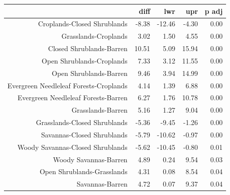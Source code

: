 \begin{table}[ht]
\centering
\begin{tabular}{rrrrr}
  \hline
 & diff & lwr & upr & p adj \\ 
  \hline
Croplands-Closed Shrublands & -8.38 & -12.46 & -4.30 & 0.00 \\ 
  Grasslands-Croplands & 3.02 & 1.50 & 4.55 & 0.00 \\ 
  Closed Shrublands-Barren & 10.51 & 5.09 & 15.94 & 0.00 \\ 
  Open Shrublands-Croplands & 7.33 & 3.12 & 11.55 & 0.00 \\ 
  Open Shrublands-Barren & 9.46 & 3.94 & 14.99 & 0.00 \\ 
  Evergreen Needleleaf Forests-Croplands & 4.14 & 1.39 & 6.88 & 0.00 \\ 
  Evergreen Needleleaf Forests-Barren & 6.27 & 1.76 & 10.78 & 0.00 \\ 
  Grasslands-Barren & 5.16 & 1.27 & 9.04 & 0.00 \\ 
  Grasslands-Closed Shrublands & -5.36 & -9.45 & -1.26 & 0.00 \\ 
  Savannas-Closed Shrublands & -5.79 & -10.62 & -0.97 & 0.00 \\ 
  Woody Savannas-Closed Shrublands & -5.62 & -10.45 & -0.80 & 0.01 \\ 
  Woody Savannas-Barren & 4.89 & 0.24 & 9.54 & 0.03 \\ 
  Open Shrublands-Grasslands & 4.31 & 0.08 & 8.54 & 0.04 \\ 
  Savannas-Barren & 4.72 & 0.07 & 9.37 & 0.04 \\ 
   \hline
\end{tabular}
\end{table}
